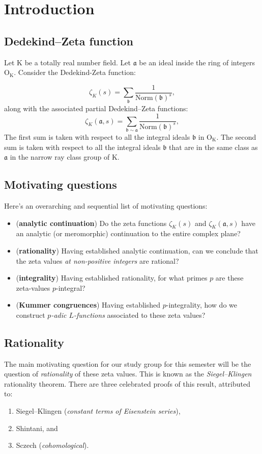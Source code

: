 \documentclass[11pt,a4paper,notitlepage]{article}
\newcommand{\OO}{\mathrm{O}}
\newcommand{\KK}{\mathrm{K}}
\newcommand{\Norm}{\mathrm{Norm}}
\begin{document}
\section{Introduction}

\subsection{Dedekind--Zeta function}
Let $\KK$ be a totally real number field. Let $\mathfrak{a}$ be an ideal inside the ring of integers $\OO_\KK$. Consider the Dedekind-Zeta function: 

\[\zeta_K(s) =  \sum \limits_{\mathfrak{b}}  \frac{1}{\Norm(\mathfrak{b})^s},\]
along with the associated partial Dedekind--Zeta functions:
\[\zeta_K(\mathfrak{a},s) =  \sum \limits_{\mathfrak{b} \sim \mathfrak{a}}  \frac{1}{\Norm(\mathfrak{b})^s},\]
The first sum is taken with respect to all the integral ideals $\mathfrak{b}$ in $\OO_\KK$. The second sum is taken with respect to all the integral ideals $\mathfrak{b}$ that are in the same class as $\mathfrak{a}$ in the narrow ray class group of $\KK$. 

\subsection{Motivating questions}
Here's an overarching and sequential list of motivating questions: 
\begin{itemize}
\item (\textbf{analytic continuation}) Do the zeta functions $\zeta_K(s)$ and $\zeta_K(\mathfrak{a},s)$  have an analytic (or meromorphic) continuation to the entire complex plane? 
\item (\textbf{rationality}) Having established analytic continuation, can we conclude that the zeta values \textit{at non-positive integers} are rational?
\item (\textbf{integrality}) Having established rationality, for what primes $p$ are these zeta-values $p$-integral? 
\item (\textbf{Kummer congruences}) Having established $p$-integrality, how do we construct \textit{$p$-adic $L$-functions} associated to these zeta values?
\end{itemize}
 
 \subsection{Rationality}
 The main motivating question for our study group for this semester will be the question of \textit{rationality} of these zeta values. This is known as the \textit{Siegel--Klingen} rationality theorem. There are three celebrated proofs of this result, attributed to:
 \begin{enumerate}
 \item Siegel--Klingen (\textit{constant terms of Eisenstein series}),
 \item Shintani, and
 \item Sczech (\textit{cohomological}).
 \end{enumerate}
\end{document}
